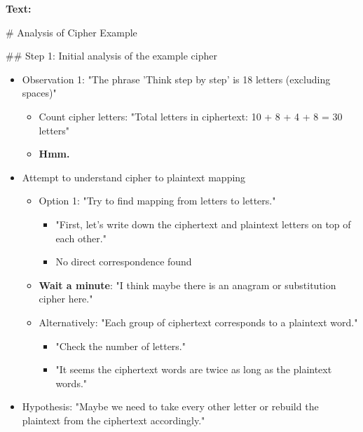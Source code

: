 \documentclass{article}
\begin{document}
\begin{tcolorbox}[colback=wkblue!10!white, colframe=wkblue!100!blue, left=2mm, right=2mm, title=\small\textcolor{black}{A document from \textsc{MathPile}-Ciphers}]
\begin{tiny}
\textcolor{meta-color}{\textbf{Text:}} 

\vspace{1.6mm}

\# Analysis of Cipher Example

\vspace{1.6mm}

\#\# Step 1: Initial analysis of the example cipher

\begin{itemize}
    \item Observation 1: "The phrase 'Think step by step' is 18 letters (excluding spaces)"
    \begin{itemize}
        \item Count cipher letters: "Total letters in ciphertext: 10 + 8 + 4 + 8 = 30 letters"
        \item \textbf{Hmm.}
    \end{itemize}
    \item Attempt to understand cipher to plaintext mapping
    \begin{itemize}
        \item Option 1: "Try to find mapping from letters to letters."
        \begin{itemize}
            \item "First, let's write down the ciphertext and plaintext letters on top of each other."
            \item No direct correspondence found
        \end{itemize}
        \item \textbf{Wait a minute}: "I think maybe there is an anagram or substitution cipher here."
        \item Alternatively: "Each group of ciphertext corresponds to a plaintext word."
        \begin{itemize}
            \item "Check the number of letters."
            \item "It seems the ciphertext words are twice as long as the plaintext words."
        \end{itemize}
    \end{itemize}
    \item Hypothesis: "Maybe we need to take every other letter or rebuild the plaintext from the ciphertext accordingly."
\end{itemize}


\end{tiny}
\end{tcolorbox}
\end{document}
